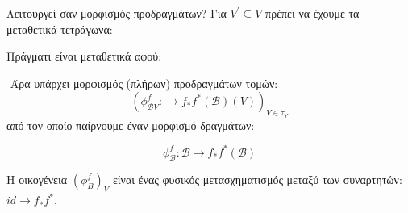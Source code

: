 \noindent Λειτουργεί σαν μορφισμός προδραγμάτων? Για $V^{\prime}\subseteq V$ πρέπει να έχουμε τα μεταθετικά τετράγωνα:

\begin{figure}[H]
    \centering
\end{figure}

\noindent Πράγματι είναι μεταθετικά αφού:
\begin{figure}[H]
    \centering
\end{figure}

$ $\newline
Άρα υπάρχει μορφισμός (πλήρων) προδραγμάτων τομών:
$$(\phi^f_{\mathcal BV}: \longrightarrow f_* f^* (\mathcal B)(V))_{V \in \tau_Y}$$ από τον οποίο παίρνουμε έναν μορφισμό δραγμάτων:

$$\phi^f_{\mathcal B}: \mathcal B \longrightarrow f_* f^* (\mathcal B)$$

\noindent Η οικογένεια $(\phi^f_B)_V$ είναι ένας φυσικός μετασχηματισμός μεταξύ των συναρτητών: $id \longrightarrow f_* f^*$.


